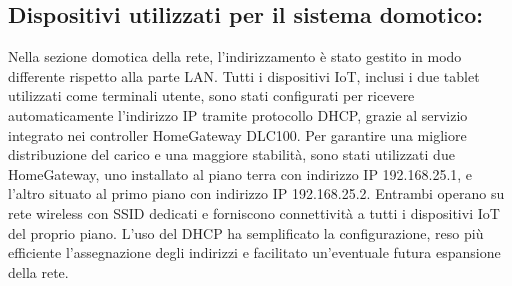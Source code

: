 \documentclass[italian, 12pt, a4paper]{article}
\begin{document}
\subsection{Dispositivi utilizzati per il sistema domotico:}\label{sec:domotico}
Nella sezione domotica della rete, l’indirizzamento è stato gestito in modo differente rispetto alla parte LAN. Tutti i dispositivi IoT, inclusi i due tablet utilizzati come terminali utente, sono stati configurati per ricevere automaticamente l’indirizzo IP tramite protocollo DHCP, grazie al servizio integrato nei controller HomeGateway DLC100. Per garantire una migliore distribuzione del carico e una maggiore stabilità, sono stati utilizzati due HomeGateway, uno installato al piano terra con indirizzo IP 192.168.25.1, e l’altro situato al primo piano con indirizzo IP 192.168.25.2. Entrambi operano su rete wireless con SSID dedicati e forniscono connettività a tutti i dispositivi IoT del proprio piano. L’uso del DHCP ha semplificato la configurazione, reso più efficiente l’assegnazione degli indirizzi e facilitato un’eventuale futura espansione della rete.
\begin{center}
        \renewcommand{\arraystretch}{1.5} %
    \end{center}
\end{document}
